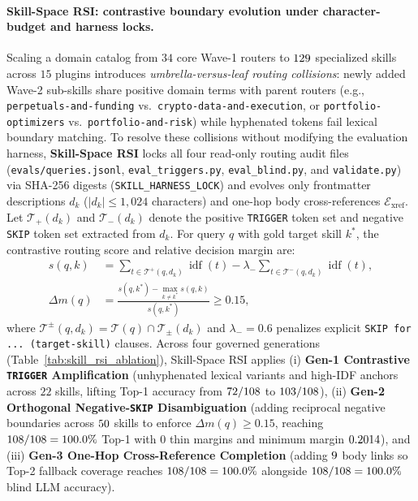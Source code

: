 \paragraph{Skill-Space RSI: contrastive boundary evolution under character-budget and harness locks.}
Scaling a domain catalog from $34$ core Wave-1 routers to $129{}$ specialized skills across $15$ plugins introduces \emph{umbrella-versus-leaf routing collisions}: newly added Wave-2 sub-skills share positive domain terms with parent routers (e.g., \texttt{perpetuals-and-funding} vs.\ \texttt{crypto-data-and-execution}, or \texttt{portfolio-optimizers} vs.\ \texttt{portfolio-and-risk}) while hyphenated tokens fail lexical boundary matching. To resolve these collisions without modifying the evaluation harness, \textbf{Skill-Space RSI} locks all four read-only routing audit files (\texttt{evals/queries.jsonl}, \texttt{eval\_triggers.py}, \texttt{eval\_blind.py}, and \texttt{validate.py}) via SHA-256 digests (\texttt{SKILL\_HARNESS\_LOCK}) and evolves only frontmatter descriptions $d_k$ ($|d_k| \le 1{,}024$ characters) and one-hop body cross-references $\mathcal{E}_{\text{xref}}$. Let $\mathcal{T}_{+}(d_k)$ and $\mathcal{T}_{-}(d_k)$ denote the positive \texttt{TRIGGER} token set and negative \texttt{SKIP} token set extracted from $d_k$. For query $q$ with gold target skill $k^*$, the contrastive routing score and relative decision margin are:
\begin{equation}
\begin{aligned}
s(q, k) &= \sum_{t \in \mathcal{T}^{+}(q, d_k)} \operatorname{idf}(t) - \lambda_{-} \!\! \sum_{t \in \mathcal{T}^{-}(q, d_k)} \operatorname{idf}(t), \\
\Delta m(q) &= \frac{s(q, k^*) - \max_{k \neq k^*} s(q, k)}{s(q, k^*)} \ge 0.15,
\end{aligned}
\label{eq:skill_rsi_margin}
\end{equation}
where $\mathcal{T}^{\pm}(q, d_k) = \mathcal{T}(q) \cap \mathcal{T}_{\pm}(d_k)$ and $\lambda_{-} = 0.6$ penalizes explicit \texttt{SKIP for ... (target-skill)} clauses. Across four governed generations (Table~\ref{tab:skill_rsi_ablation}), Skill-Space RSI applies (i) \textbf{Gen-1 Contrastive \texttt{TRIGGER} Amplification} (unhyphenated lexical variants and high-IDF anchors across $22$ skills, lifting Top-1 accuracy from $72{}/108$ to $103{}/108$), (ii) \textbf{Gen-2 Orthogonal Negative-\texttt{SKIP} Disambiguation} (adding reciprocal negative boundaries across $50{}$ skills to enforce $\Delta m(q) \ge 0.15$, reaching $108{}/108 = 100.0{}\%$ Top-1 with $0$ thin margins and minimum margin $0.2014{}$), and (iii) \textbf{Gen-3 One-Hop Cross-Reference Completion} (adding $9{}$ body links so Top-2 fallback coverage reaches $108{}/108 = 100.0\%$ alongside $108{}/108 = 100.0\%$ blind LLM accuracy).

